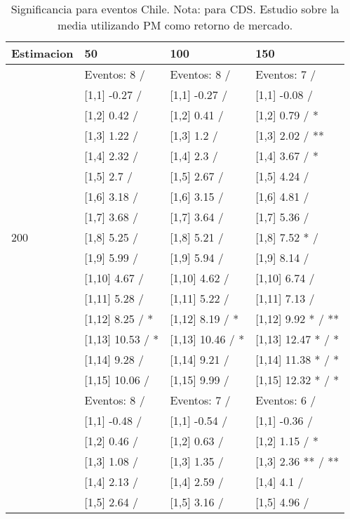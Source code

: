\begin{table}

\caption{Significancia para eventos Chile. Nota: para CDS. Estudio sobre la media utilizando PM como retorno de mercado.}
\centering
\begin{tabular}[t]{llll}
\toprule
Estimacion & 50 & 100 & 150\\
\midrule
 & Eventos:  8 / & Eventos:  8 / & Eventos:  7 /\\
 & {}[1,1] -0.27  / & {}[1,1] -0.27  / & {}[1,1] -0.08  /\\
 & {}[1,2] 0.42  / & {}[1,2] 0.41  / & {}[1,2] 0.79  / *\\
 & {}[1,3] 1.22  / & {}[1,3] 1.2  / & {}[1,3] 2.02  / **\\
 & {}[1,4] 2.32  / & {}[1,4] 2.3  / & {}[1,4] 3.67  / *\\
\addlinespace
 & {}[1,5] 2.7  / & {}[1,5] 2.67  / & {}[1,5] 4.24  /\\
 & {}[1,6] 3.18  / & {}[1,6] 3.15  / & {}[1,6] 4.81  /\\
 & {}[1,7] 3.68  / & {}[1,7] 3.64  / & {}[1,7] 5.36  /\\
200 & {}[1,8] 5.25  / & {}[1,8] 5.21  / & {}[1,8] 7.52 * /\\
 & {}[1,9] 5.99  / & {}[1,9] 5.94  / & {}[1,9] 8.14  /\\
\addlinespace
 & {}[1,10] 4.67  / & {}[1,10] 4.62  / & {}[1,10] 6.74  /\\
 & {}[1,11] 5.28  / & {}[1,11] 5.22  / & {}[1,11] 7.13  /\\
 & {}[1,12] 8.25  / * & {}[1,12] 8.19  / * & {}[1,12] 9.92 * / **\\
 & {}[1,13] 10.53  / * & {}[1,13] 10.46  / * & {}[1,13] 12.47 * / *\\
 & {}[1,14] 9.28  / & {}[1,14] 9.21  / & {}[1,14] 11.38 * / *\\
\addlinespace
 & {}[1,15] 10.06  / & {}[1,15] 9.99  / & {}[1,15] 12.32 * / *\\
 & Eventos:  8 / & Eventos:  7 / & Eventos:  6 /\\
 & {}[1,1] -0.48  / & {}[1,1] -0.54  / & {}[1,1] -0.36  /\\
 & {}[1,2] 0.46  / & {}[1,2] 0.63  / & {}[1,2] 1.15  / *\\
 & {}[1,3] 1.08  / & {}[1,3] 1.35  / & {}[1,3] 2.36 ** / **\\
\addlinespace
 & {}[1,4] 2.13  / & {}[1,4] 2.59  / & {}[1,4] 4.1  /\\
 & {}[1,5] 2.64  / & {}[1,5] 3.16  / & {}[1,5] 4.96  /\\

\end{tabular}
\end{table}

